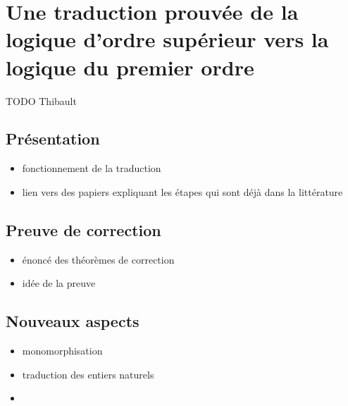 \section{Une traduction prouvée de la logique d'ordre supérieur vers la
  logique du premier ordre}
\label{sec:traduction}

TODO Thibault


\subsection{Présentation}

\begin{itemize}
\item fonctionnement de la traduction
\item lien vers des papiers expliquant les étapes qui sont déjà dans la
  littérature
\end{itemize}


\subsection{Preuve de correction}

\begin{itemize}
\item énoncé des théorèmes de correction
\item idée de la preuve
\end{itemize}


\subsection{Nouveaux aspects}
\label{sec:traduction:nouveautes}

\begin{itemize}
\item monomorphisation
\item traduction des entiers naturels
\item 

\end{itemize}
